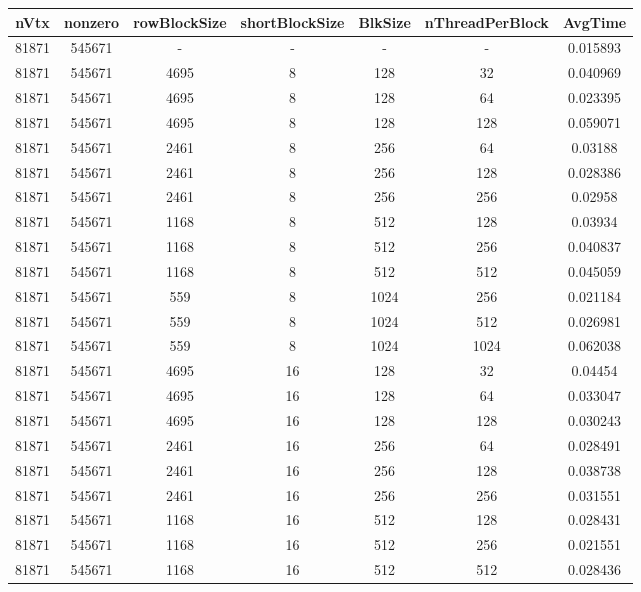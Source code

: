 \documentclass[9pt]{article}
\begin{document}
\SetBgPosition{0.25cm,-5.0cm}
\begin{tabular}{|c|c|c|c|c|c|c| }  
\hline
nVtx  & nonzero  & rowBlockSize  & shortBlockSize  & BlkSize  & nThreadPerBlock  & AvgTime \\
\hline
81871  & 545671  &  -  & -  & -  & -  &0.015893 \\
\hline
81871  & 545671  & 4695  & 8  & 128  & 32  & 0.040969 \\
\hline
81871  & 545671  & 4695  & 8  & 128  & 64  & 0.023395 \\
\hline
81871  & 545671  & 4695  & 8  & 128  & 128  & 0.059071 \\
\hline
81871  & 545671  & 2461  & 8  & 256  & 64  & 0.03188 \\
\hline
81871  & 545671  & 2461  & 8  & 256  & 128  & 0.028386 \\
\hline
81871  & 545671  & 2461  & 8  & 256  & 256  & 0.02958 \\
\hline
81871  & 545671  & 1168  & 8  & 512  & 128  & 0.03934 \\
\hline
81871  & 545671  & 1168  & 8  & 512  & 256  & 0.040837 \\
\hline
81871  & 545671  & 1168  & 8  & 512  & 512  & 0.045059 \\
\hline
81871  & 545671  & 559  & 8  & 1024  & 256  & 0.021184 \\
\hline
81871  & 545671  & 559  & 8  & 1024  & 512  & 0.026981 \\
\hline
81871  & 545671  & 559  & 8  & 1024  & 1024  & 0.062038 \\
\hline
81871  & 545671  & 4695  & 16  & 128  & 32  & 0.04454 \\
\hline
81871  & 545671  & 4695  & 16  & 128  & 64  & 0.033047 \\
\hline
81871  & 545671  & 4695  & 16  & 128  & 128  & 0.030243 \\
\hline
81871  & 545671  & 2461  & 16  & 256  & 64  & 0.028491 \\
\hline
81871  & 545671  & 2461  & 16  & 256  & 128  & 0.038738 \\
\hline
81871  & 545671  & 2461  & 16  & 256  & 256  & 0.031551 \\
\hline
81871  & 545671  & 1168  & 16  & 512  & 128  & 0.028431 \\
\hline
81871  & 545671  & 1168  & 16  & 512  & 256  & 0.021551 \\
\hline
81871  & 545671  & 1168  & 16  & 512  & 512  & 0.028436 \\

\end{tabular}
\end{document}
